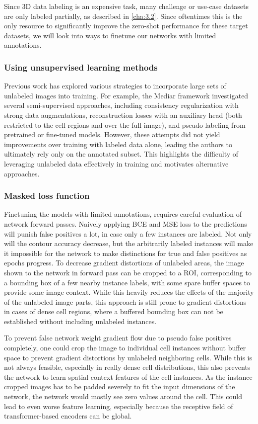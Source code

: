 Since 3D data labeling is an expensive task, many challenge or use-case datasets are only labeled partially, as described in \ref{cha:3.2}. Since oftentimes this is the only resource to significantly improve the zero-shot performance for these target datasets, we will look into ways to finetune our networks with limited annotations. 

\subsubsection{Using unsupervised learning methods}

Previous work has explored various strategies to incorporate large sets of unlabeled images into training. For example, the Mediar framework investigated several semi-supervised approaches, including consistency regularization with strong data augmentations, reconstruction losses with an auxiliary head (both restricted to the cell regions and over the full image), and pseudo-labeling from pretrained or fine-tuned models. However, these attempts did not yield improvements over training with labeled data alone, leading the authors to ultimately rely only on the annotated subset. This highlights the difficulty of leveraging unlabeled data effectively in training and motivates alternative approaches.

\subsubsection{Masked loss function}

Finetuning the models with limited annotations, requires careful evaluation of network forward passes. Naively applying BCE and MSE loss to the predictions will punish false positives a lot, in case only a few instances are labeled. Not only will the contour accuracy decrease, but the arbitrarily labeled instances will make it impossible for the network to make distinctions for true and false positives as epochs progress. To decrease gradient distortions of unlabeled areas, the image shown to the network in forward pass can be cropped to a ROI, corresponding to a bounding box of a few nearby instance labels, with some spare buffer spaces to provide some image context. While this heavily reduces the effects of the majority of the unlabeled image parts, this approach is still prone to gradient distortions in cases of dense cell regions, where a buffered bounding box can not be established without including unlabeled instances.

To prevent false network weight gradient flow due to pseudo false positives completely, one could crop the image to individual cell instances without buffer space to prevent gradient distortions by unlabeled neighboring cells. While this is not always feasible, especially in really dense cell distributions, this also prevents the network to learn spatial context features of the cell instances. As the instance cropped images has to be padded severely to fit the input dimensions of the network, the network would mostly see zero values around the cell. This could lead to even worse feature learning, especially because the receptive field of transformer-based encoders can be global.

